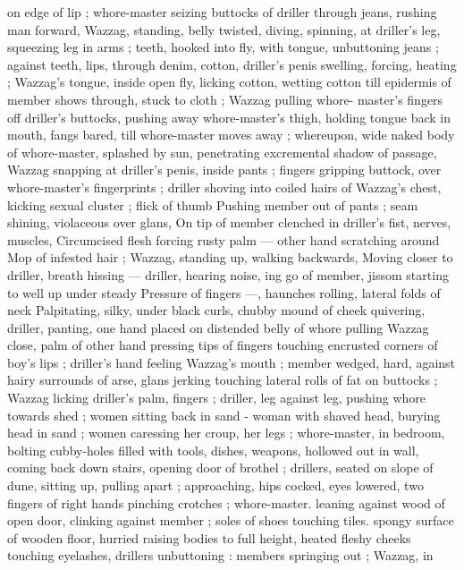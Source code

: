 on edge of lip ; whore-master seizing buttocks of driller through 
jeans, rushing man forward, Wazzag, standing, belly twisted, diving, 
spinning, at driller's leg, squeezing leg in arms ; teeth, hooked into 
fly, with tongue, unbuttoning jeans ; against teeth, lips, through 
denim, cotton, driller's penis swelling, forcing, heating ; Wazzag's 
tongue, inside open fly, licking cotton, wetting cotton till epidermis 
of member shows through, stuck to cloth ; Wazzag pulling whore- 
master's fingers off driller's buttocks, pushing away whore-master's 
thigh, holding tongue back in mouth, fangs bared, till whore-master 
moves away ; whereupon, wide naked body of whore-master, 
splashed by sun, penetrating excremental shadow of passage, 
Wazzag snapping at driller's penis, inside pants ; fingers gripping 
buttock, over whore-master's fingerprints ; driller shoving into coiled 
hairs of Wazzag's chest, kicking sexual cluster ; flick of thumb 
Pushing member out of pants ; seam shining, violaceous over glans, 
On tip of member clenched in driller's fist, nerves, muscles, 
Circumcised flesh forcing rusty palm --- other hand scratching around 
Mop of infested hair ; Wazzag, standing up, walking backwards, 
Moving closer to driller, breath hissing --- driller, hearing noise, 
ing go of member, jissom starting to well up under steady 
Pressure of fingers ---, haunches rolling, lateral folds of neck 
Palpitating, silky, under black curls, chubby mound of cheek 
quivering, driller, panting, one hand placed on distended belly of 
whore pulling Wazzag close, palm of other hand pressing tips of 
fingers touching encrusted corners of boy's lips ; driller's hand 
feeling Wazzag's mouth ; member wedged, hard, against hairy 
surrounds of arse, glans jerking touching lateral rolls of fat on 
buttocks ; Wazzag licking driller's palm, fingers ; driller, leg against 
leg, pushing whore towards shed ; women sitting back in sand - 
woman with shaved head, burying head in sand ; women caressing 
her croup, her legs ; whore-master, in bedroom, bolting cubby-holes 
filled with tools, dishes, weapons, hollowed out in wall, coming back 
down stairs, opening door of brothel ; drillers, seated on slope of 
dune, sitting up, pulling apart ; approaching, hips cocked, eyes 
lowered, two fingers of right hands pinching crotches ; whore-master. 
leaning against wood of open door, clinking against member ; soles 
of shoes touching tiles. spongy surface of wooden floor, hurried 
raising bodies to full height, heated fleshy cheeks touching 
eyelashes, drillers unbuttoning : members springing out ; Wazzag, in 
